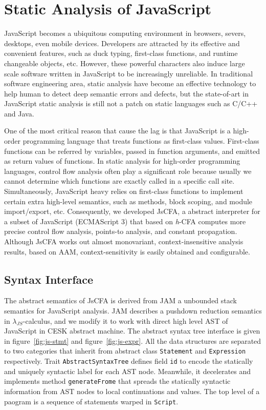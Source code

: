 \documentclass{article}
\begin{document}
\section{Static Analysis of JavaScript}
\label{sec:Static Analysis of JavaScript}
JavaScript becomes a ubiquitous computing environment in browsers, severs, desktops, even mobile devices. Developers are attracted by its effective and convenient features, such as duck typing, first-class functions, and runtime changeable objects, etc. However, these powerful characters also induce large scale software written in JavaScript to be increasingly unreliable.
In traditional software engineering area, static analysis have become an effective technology to help human to detect deep semantic errors and defects, but the state-of-art in JavaScript static analysis is still not a patch on static languages such as C/C++ and Java.

One of the most critical reason that cause the lag is that JavaScript is a high-order programming language that treats functions as first-class values. First-class functions can be referred by variables, passed in function arguments, and emitted as return values of functions. In static analysis for high-order programming languages, control flow analysis often play a significant role because usually we cannot determine which functions are exactly called in a specific call site. Simultaneously, JavaScript heavy relies on first-class functions to implement certain extra high-level semantics, such as methods, block scoping, and module import/export, etc.
Consequently, we developed JsCFA, a abstract interpreter for a subset of JavaScript (ECMAScript 3) that based on \textit{h}-CFA computes more precise control flow analysis, points-to analysis, and constant propagation. Although JsCFA works out almost monovariant, context-insensitive analysis results, based on AAM, context-sensitivity is easily obtained and configurable.

\subsection{Syntax Interface}
\label{sub:Syntax}

The abstract semantics of JsCFA is derived from JAM a unbounded stack semantics for JavaScript analysis. JAM describes a pushdown reduction semantics in $\lambda_{JS}$-calculus, and we modify it to work with direct high level AST of JavaScript in CESK abstract machine. The abstract syntax tree interface is given in figure~\ref{fig:js-stmt} and figure~\ref{fig:js-expr}.
All the data structures are separated to two categories that inherit from abstract class \verb|Statement| and \verb|Expression| respectively. Trait \verb|AbstractSyntaxTree| defines field \verb|id| to encode the statically and uniquely syntactic label for each AST node. Meanwhile, it decelerates and implements method \verb|generateFrome| that spreads the statically syntactic information from AST nodes to local continuations and values. The top level of a paogram is a sequence of statements warped in \verb|Script|.
\end{document}
